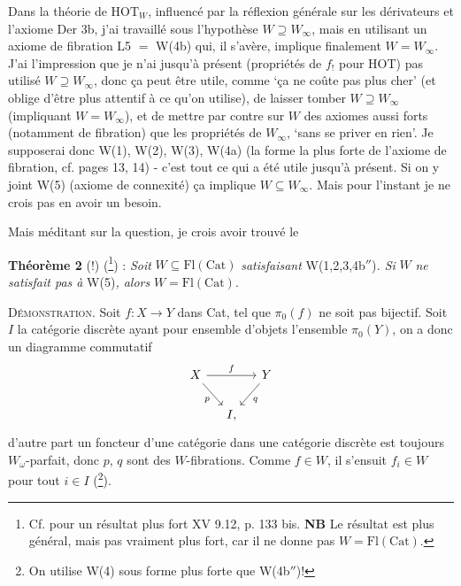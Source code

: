 \documentclass[11pt]{article}
\newcommand{\msp}[1]{\marginpar{\footnotesize [#1]}}
\newcommand{\Fl}{\mathrm{Fl}}
\newcommand{\Cat}{\mathrm{Cat}}
\begin{document}
\msp{page 20}Dans la théorie de $\mathrm{HOT}_W$, influencé par la réflexion générale sur les dérivateurs et l'axiome Der 3b, j'ai travaillé sous l'hypothèse $W \supseteq W_\infty$, mais en utilisant un axiome de fibration L5 $=$ W(4b) qui, il s'avère, implique finalement $W = W_\infty$. J'ai l'impression que je n'ai jusqu'à présent (propriétés de $f_!$ pour HOT) pas utilisé $W \supseteq W_\infty$, donc ça peut être utile, comme `ça ne coûte pas plus cher' (et oblige d'être plus attentif à ce qu'on utilise), de laisser tomber $W \supseteq W_\infty$ (impliquant $W = W_\infty$), et de mettre par contre sur $W$ des axiomes aussi forts (notamment de fibration) que les propriétés de $W_\infty$, `sans se priver en rien'. Je supposerai donc W(1), W(2), W(3), W(4a) (la forme la plus forte de l'axiome de fibration, cf. pages 13, 14) - c'est tout ce qui a été utile jusqu'à présent. Si on y joint W(5) (axiome de connexité) ça implique $W \subseteq W_\infty$. Mais pour l'instant je ne crois pas en avoir un besoin.

Mais méditant sur la question, je crois avoir trouvé le

\textbf{Théorème 2} (!) (\footnote[41]{Cf. pour un résultat plus fort XV 9.12, p. 133 bis. \textbf{NB} Le résultat est plus général, mais pas vraiment plus fort, car il ne donne pas $W = \Fl(\Cat)$.}) : \textit{Soit} $W \subseteq \Fl(\Cat)$ \textit{satisfaisant} W(1,2,3,4b$''$)\textit{. Si} $W$ \textit{ne satisfait pas à} W(5)\textit{, alors} $W = \Fl(\Cat)$.

\textsc{Démonstration}. Soit $f : X \longrightarrow Y$ dans Cat, tel que $\pi_0(f)$ ne soit pas bijectif. Soit $I$ la catégorie discrète ayant pour ensemble d'objets l'ensemble $\pi_0(Y)$, on a donc un diagramme commutatif
\[
\begin{tikzcd}[column sep=small]
X \arrow[rr, "f"] \arrow[dr, "p"'] & & Y \arrow[dl, "q"] \\
& I, &
\end{tikzcd}
\]
d'autre part un foncteur d'une catégorie dans une catégorie discrète est toujours $W_\omega$-parfait, donc $p$, $q$ sont des $W$-fibrations. Comme\msp{page 21} $f \in W$, il s'ensuit $f_i \in W$ pour tout $i \in I$ (\footnote[42]{On utilise W(4) sous forme plus forte que W(4b$''$)!}).
\end{document}

